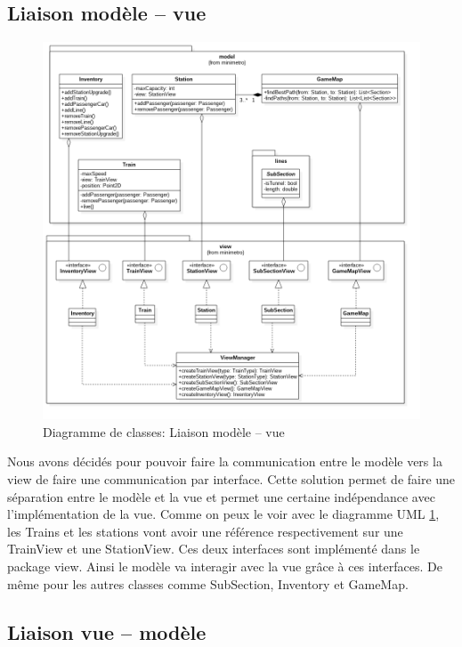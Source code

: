 \documentclass[report, backcover, french, nodocumentinfo]{upmethodology-document}
\begin{document}
		\subsection{Liaison modèle -- vue}
			\begin{figure}[h!]
				\centering
				\includegraphics[width=\textwidth]{figures/ModelViewLinkClassDiagram}
				\caption{Diagramme de classes: Liaison modèle -- vue}
				\label{fig:ModelViewLinkClassDiagram}
			\end{figure}
				Nous avons décidés pour pouvoir faire la communication entre le modèle vers la view de faire une communication par interface. Cette solution permet de faire une séparation entre le modèle et la vue et permet une certaine indépendance avec l'implémentation de la vue.
				Comme on peux le voir avec le diagramme UML \ref{fig:ModelViewLinkClassDiagram}, les Trains et les stations vont avoir une référence respectivement sur une TrainView et une StationView. Ces deux interfaces sont implémenté dans le package view. Ainsi le modèle va interagir avec la vue grâce à ces interfaces. De même pour les autres classes comme SubSection, Inventory et GameMap.
		\subsection{Liaison vue -- modèle}
\end{document}
